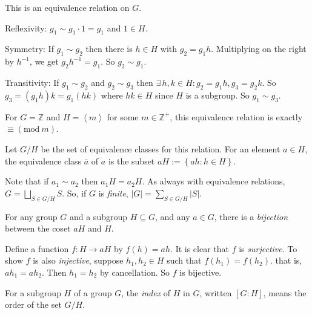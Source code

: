 \documentclass{notes}
\begin{document}
\begin{lem}
  This is an equivalence relation on $G$.
\end{lem}

\begin{prf}
  Reflexivity: $g_1 \sim g_1 \cdot 1 = g_1$ and $1 \in H$.

  Symmetry: If $g_1 \sim g_2$ then there is $h \in H$ with $g_2 = g_1 h$.
  Multiplying on the right by $h^{-1}$, we get $g_2 h^{-1} = g_1$.
  So $g_2 \sim g_1$.

  Transitivity: If $g_1 \sim g_2$ and $g_2 \sim g_3$ then $\exists \, h, k \in H: g_2 = g_1 h, g_3 = g_2 k$.
  So $g_3 = (g_1 h) k = g_1 (h k)$ where $h k \in H$ since $H$ is a subgroup.
  So $g_1 \sim g_3$.
\end{prf}

\begin{eg}
  For $G = \mathbb Z$ and $H = \left \langle m \right \rangle$ for some $m \in \mathbb Z^+$, this equivalence relation is exactly $\equiv (\mathrm{mod}\ m)$.
\end{eg}

\begin{defn}
  Let {\boldmath \bfseries $G / H$} be the set of equivalence classes for this relation.
  For an element $a \in H$, the equivalence class $\overline a$ of $a$ is the subset $a H := \left \{ a h : h \in H \right \}$.
\end{defn}

Note that if $a_1 \sim a_2$ then $a_1 H = a_2 H$.
As always with equivalence relations, $G = \bigsqcup_{S \in G / H} S$.
So, if $G$ is \textit{finite}, $\left | G \right | = \sum_{S \in G / H} \left | S \right |$.

\begin{prop}
  For any group $G$ and a subgroup $H \subseteq G$, and any $a \in G$, there is a \textit{bijection} between the coset $a H$ and $H$. 
\end{prop}

\begin{prf}
  Define a function $f \colon H \to a H$ by $f(h) = a h$.
  It is clear that $f$ is \textit{surjective}.
  To show $f$ is also \textit{injective}, suppose $h_1, h_2 \in H$ such that $f(h_1) = f(h_2)$.
  that is, $a h_1 = a h_2$.
  Then $h_1 = h_2$ by cancellation.
  So $f$ is bijective.
\end{prf}

\begin{defn}
  For a subgroup $H$ of a group $G$, the \textit{index} of $H$ in $G$, written $[G : H]$, means the order of the set $G / H$.
\end{defn}
\end{document}
